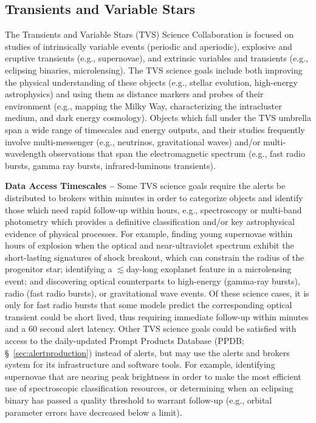 \subsection{Transients and Variable Stars}\label{ssec:sci_tvs}

The Transients and Variable Stars (TVS) Science Collaboration is focused on studies of intrinsically variable events (periodic and aperiodic), explosive and eruptive transients (e.g., supernovae), and extrinsic variables and transients (e.g., eclipsing binaries, microlensing).
The TVS science goals include both improving the physical understanding of these objects (e.g., stellar evolution, high-energy astrophysics) and using them as distance markers and probes of their environment (e.g., mapping the Milky Way, characterizing the intracluster medium, and dark energy cosmology).
Objects which fall under the TVS umbrella span a wide range of timescales and energy outputs, and their studies frequently involve multi-messenger (e.g., neutrinos, gravitational waves) and/or multi-wavelength observations that span the electromagnetic spectrum (e.g., fast radio bursts, gamma ray bursts, infrared-luminous transients). 

{\bf Data Access Timescales --}
Some TVS science goals require the alerts be distributed to brokers within minutes in order to categorize objects and identify those which need rapid follow-up within hours, e.g., spectroscopy or multi-band photometry which provides a definitive classification and/or key astrophysical evidence of physical processes.
For example, finding young supernovae within hours of explosion when the optical and near-ultraviolet spectrum exhibit the short-lasting signatures of shock breakout, which can constrain the radius of the progenitor star; identifying a $\lesssim$day-long exoplanet feature in a microlensing event; and discovering optical counterparts to high-energy (gamma-ray bursts), radio (fast radio bursts), or gravitational wave events.
Of these science cases, it is only for fast radio bursts that some models predict the corresponding optical transient could be short lived, thus requiring immediate follow-up within minutes and a $60$ second alert latency.
Other TVS science goals could be satisfied with access to the daily-updated Prompt Products Database (PPDB; \S~\ref{sec:alertproduction}) instead of alerts, but may use the alerts and brokers system for its infrastructure and software tools.
For example, identifying supernovae that are nearing peak brightness in order to make the most efficient use of spectroscopic classification resources, or determining when an eclipsing binary has passed a quality threshold to warrant follow-up (e.g., orbital parameter errors have decreased below a limit).

